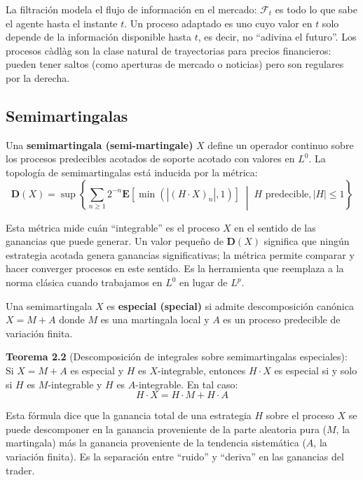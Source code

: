 \documentclass[12pt]{article}
\begin{document}
\begin{intuicion}
La filtraci\'on modela el flujo de informaci\'on en el mercado: $\mathscr{F}_t$ es todo lo que sabe el agente hasta el instante $t$. Un proceso adaptado es uno cuyo valor en $t$ solo depende de la informaci\'on disponible hasta $t$, es decir, no ``adivina el futuro''. Los procesos c\`adl\`ag son la clase natural de trayectorias para precios financieros: pueden tener saltos (como aperturas de mercado o noticias) pero son regulares por la derecha.
\end{intuicion}

\subsection{Semimartingalas}

Una \textbf{semimartingala (semi-martingale)} $X$ define un operador continuo sobre los procesos predecibles acotados de soporte acotado con valores en $L^0$. La topolog\'ia de semimartingalas est\'a inducida por la m\'etrica:
\begin{equation}
    \mathbf{D}(X) = \sup\left\{ \sum_{n \geq 1} 2^{-n} \mathbf{E}[\min(|(H \cdot X)_n|, 1)] \;\middle|\; H \text{ predecible}, |H| \leq 1 \right\}
\end{equation}

\begin{intuicionmat}
Esta m\'etrica mide cu\'an ``integrable'' es el proceso $X$ en el sentido de las ganancias que puede generar. Un valor peque\~no de $\mathbf{D}(X)$ significa que ning\'un estrategia acotada genera ganancias significativas; la m\'etrica permite comparar y hacer converger procesos en este sentido. Es la herramienta que reemplaza a la norma cl\'asica cuando trabajamos en $L^0$ en lugar de $L^p$.
\end{intuicionmat}

Una semimartingala $X$ es \textbf{especial (special)} si admite descomposici\'on can\'onica $X = M + A$ donde $M$ es una martingala local y $A$ es un proceso predecible de variaci\'on finita.

\textbf{Teorema 2.2} (Descomposici\'on de integrales sobre semimartingalas especiales): Si $X = M + A$ es especial y $H$ es $X$-integrable, entonces $H \cdot X$ es especial si y solo si $H$ es $M$-integrable y $H$ es $A$-integrable. En tal caso:
\begin{equation}
    H \cdot X = H \cdot M + H \cdot A
\end{equation}

\begin{intuicionmat}
Esta f\'ormula dice que la ganancia total de una estrategia $H$ sobre el proceso $X$ se puede descomponer en la ganancia proveniente de la parte aleatoria pura ($M$, la martingala) m\'as la ganancia proveniente de la tendencia sistem\'atica ($A$, la variaci\'on finita). Es la separaci\'on entre ``ruido'' y ``deriva'' en las ganancias del trader.
\end{intuicionmat}
\end{document}
